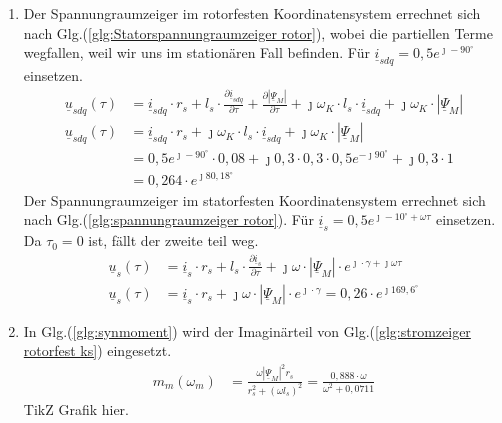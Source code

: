 \begin{solution}
\begin{enumerate}
\item Der Spannungraumzeiger im rotorfesten Koordinatensystem errechnet sich nach Glg.(\ref{glg:Statorspannungraumzeiger rotor}), wobei die partiellen Terme wegfallen, weil wir uns im station\"aren Fall befinden. F\"ur $\underline{i}_{sdq}= 0,5 e^{\jmath -90^\circ}$ einsetzen.
\begin{align}
\underline{u}_{sdq}(\tau) &= \underline{i}_{sdq} \cdot r_s + l_s \cdot \frac{\partial \underline{i}_{sdq}}{\partial \tau} + \frac{\partial |\underline{\Psi}_M|}{\partial \tau} + \jmath \omega_K \cdot l_s \cdot \underline{i}_{sdq} + \jmath \omega_K \cdot |\underline{\Psi}_M|\\
\underline{u}_{sdq}(\tau) &= \underline{i}_{sdq} \cdot r_s + \jmath \omega_K \cdot l_s \cdot \underline{i}_{sdq} + \jmath \omega_K \cdot |\underline{\Psi}_M|\\
&= 0,5 e^{\jmath -90^\circ} \cdot 0,08 + \jmath 0,3 \cdot 0,3 \cdot 0,5 e^{-\jmath 90^\circ}+\jmath 0,3 \cdot 1\\
&=0,264 \cdot e^{\jmath 80,18^\circ}
\end{align}
Der Spannungraumzeiger im statorfesten Koordinatensystem errechnet sich nach Glg.(\ref{glg:spannungraumzeiger rotor}). F\"ur $\underline{i}_{s}= 0,5 e^{\jmath -10^\circ+\omega \tau}$ einsetzen. Da $\tau_0 = 0$ ist, f\"allt der zweite teil weg.
\begin{align}
\underline{u}_s(\tau) &= \underline{i}_s \cdot r_s + l_s \cdot \frac{\partial \underline{i}_s}{\partial \tau} + \jmath\omega \cdot|\underline{\Psi}_M | \cdot e^{\jmath \cdot \gamma + \jmath \omega \tau}\\
\underline{u}_s(\tau) &= \underline{i}_s \cdot r_s + \jmath\omega \cdot|\underline{\Psi}_M | \cdot e^{\jmath \cdot \gamma}=0,26\cdot e^{\jmath 169,6^\circ}
\end{align}
\item In Glg.(\ref{glg:synmoment}) wird der Imagin\"arteil von Glg.(\ref{glg:stromzeiger rotorfest ks}) eingesetzt.
\begin{align}
m_m(\omega_m) &= \frac{\omega |\underline{\Psi}_M|^2 r_s}{r_s^2 + (\omega l_s)^2}=\frac{0,888 \cdot \omega}{\omega^2 + 0,0711}
\end{align}
TikZ Grafik hier.
\end{enumerate}
\end{solution}